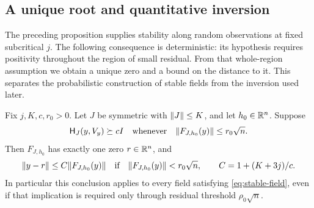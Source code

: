 \subsection{A unique root and quantitative inversion}

The preceding proposition supplies stability along random observations
at fixed subcritical $j$. The following consequence is deterministic:
its hypothesis requires positivity throughout the region of small
residual. From that whole-region assumption we obtain a unique zero
and a bound on the distance to it. This separates the probabilistic
construction of stable fields from the inversion used later.

\begin{lemma}
\label{lem:root}
Fix $j,K,c,r_0>0$.  Let $J$ be symmetric with $\lVert J\rVert\le K$, and
let $h_0\in\mathbb R^n$.  Suppose
\begin{equation}
 \mathsf H_J(y,V_y)\succeq cI
 \quad\text{whenever}\quad
 \lVert F_{J,h_0}(y)\rVert\le r_0\sqrt n.
 \label{eq:root-stability-assumption}
\end{equation}
Then $F_{J,h_0}$ has exactly one zero $r\in\mathbb R^n$, and
\begin{equation}
 \lVert y-r\rVert\le C\lVert F_{J,h_0}(y)\rVert
 \quad\text{if}\quad\lVert F_{J,h_0}(y)\rVert<r_0\sqrt n,
 \qquad C=1+(K+3j)/c.
 \label{eq:root-distance}
\end{equation}
In particular this conclusion applies to every field satisfying
\eqref{eq:stable-field}, even if that implication is required only
through residual threshold $\rho_0\sqrt n$.
\end{lemma}

